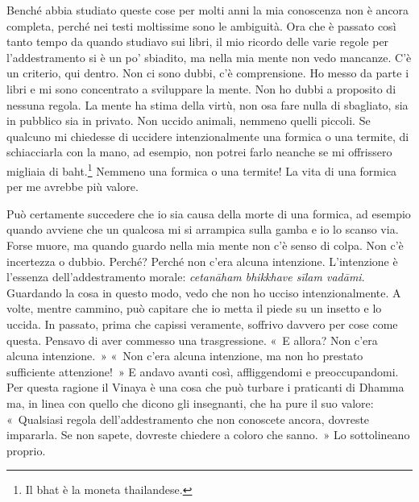 Benché abbia studiato queste cose per molti anni la mia conoscenza non è
ancora completa, perché nei testi moltissime sono le ambiguità. Ora che
è passato così tanto tempo da quando studiavo sui libri, il mio ricordo
delle varie regole per l'addestramento si è un po' sbiadito, ma nella
mia mente non vedo mancanze. C'è un criterio, qui dentro. Non ci sono
dubbi, c'è comprensione. Ho messo da parte i libri e mi sono concentrato
a sviluppare la mente. Non ho dubbi a proposito di nessuna regola. La
mente ha stima della virtù, non osa fare nulla di sbagliato, sia in
pubblico sia in privato. Non uccido animali, nemmeno quelli piccoli. Se
qualcuno mi chiedesse di uccidere intenzionalmente una formica o una
termite, di schiacciarla con la mano, ad esempio, non potrei farlo
neanche se mi offrissero migliaia di baht.\footnote{Il bhat è la moneta
  thailandese.} Nemmeno una formica o una termite! La vita di una
formica per me avrebbe più valore.

Può certamente succedere che io sia causa della morte di una formica, ad
esempio quando avviene che un qualcosa mi si arrampica sulla gamba e io
lo scanso via. Forse muore, ma quando guardo nella mia mente non c'è
senso di colpa. Non c'è incertezza o dubbio. Perché? Perché non c'era
alcuna intenzione. L'intenzione è l'essenza dell'addestramento morale:
\emph{cetanāham bhikkhave sīlam vadāmi}. Guardando la cosa in questo
modo, vedo che non ho ucciso intenzionalmente. A volte, mentre cammino,
può capitare che io metta il piede su un insetto e lo uccida. In
passato, prima che capissi veramente, soffrivo davvero per cose come
questa. Pensavo di aver commesso una trasgressione. «~E allora? Non
c'era alcuna intenzione.~» «~Non c'era alcuna intenzione, ma non ho
prestato sufficiente attenzione!~» E andavo avanti così, affliggendomi e
preoccupandomi. Per questa ragione il Vinaya è una cosa che può turbare
i praticanti di Dhamma ma, in linea con quello che dicono gli
insegnanti, che ha pure il suo valore: «~Qualsiasi regola
dell'addestramento che non conoscete ancora, dovreste impararla. Se non
sapete, dovreste chiedere a coloro che sanno.~» Lo sottolineano proprio.

